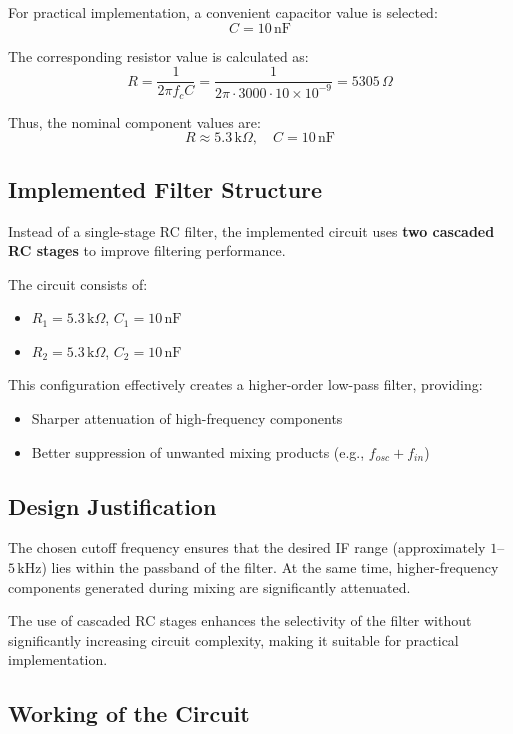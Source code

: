 \documentclass[conference]{IEEEtran}
\begin{document}
For practical implementation, a convenient capacitor value is selected:
\[
C = 10\,\text{nF}
\]

The corresponding resistor value is calculated as:
\[
R = \frac{1}{2\pi f_c C}
= \frac{1}{2\pi \cdot 3000 \cdot 10 \times 10^{-9}}
= 5305\,\Omega
\]

Thus, the nominal component values are:
\[
R \approx 5.3\,\text{k}\Omega, \quad C = 10\,\text{nF}
\]

\subsection{Implemented Filter Structure}

Instead of a single-stage RC filter, the implemented circuit uses \textbf{two cascaded RC stages} to improve filtering performance.

The circuit consists of:
\begin{itemize}
    \item $R_1 = 5.3\,\text{k}\Omega$, $C_1 = 10\,\text{nF}$
    \item $R_2 = 5.3\,\text{k}\Omega$, $C_2 = 10\,\text{nF}$
\end{itemize}

This configuration effectively creates a higher-order low-pass filter, providing:
\begin{itemize}
    \item Sharper attenuation of high-frequency components
    \item Better suppression of unwanted mixing products (e.g., $f_{osc} + f_{in}$)
\end{itemize}

\subsection{Design Justification}

The chosen cutoff frequency ensures that the desired IF range (approximately $1$--$5\,\text{kHz}$) lies within the passband of the filter. At the same time, higher-frequency components generated during mixing are significantly attenuated.

The use of cascaded RC stages enhances the selectivity of the filter without significantly increasing circuit complexity, making it suitable for practical implementation.

\subsection{Working of the Circuit}
\end{document}
